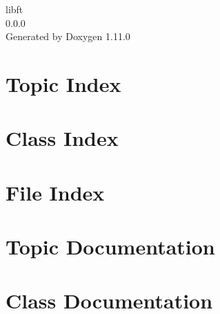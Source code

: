 \documentclass[twoside]{book}
\newcommand{\+}{\discretionary{\mbox{\scriptsize$\hookleftarrow$}}{}{}}
\newcommand{\clearemptydoublepage}{%
    \newpage{\pagestyle{empty}\cleardoublepage}%
  }
\begin{document}
  \raggedbottom
    \hypersetup{pageanchor=false,
                bookmarksnumbered=true,
                pdfencoding=unicode
               }
  \begin{titlepage}
  \vspace*{7cm}
  \begin{center}%
  {\Large libft}\\
  [1ex]\large 0.\+0.\+0 \\
  \vspace*{1cm}
  {\large Generated by Doxygen 1.11.0}\\
  \end{center}
  \end{titlepage}
  \clearemptydoublepage
  \tableofcontents
  \clearemptydoublepage
  \hypersetup{pageanchor=true}

\chapter{Topic Index}

\chapter{Class Index}

\chapter{File Index}

\chapter{Topic Documentation}

\chapter{Class Documentation}


\end{document}
